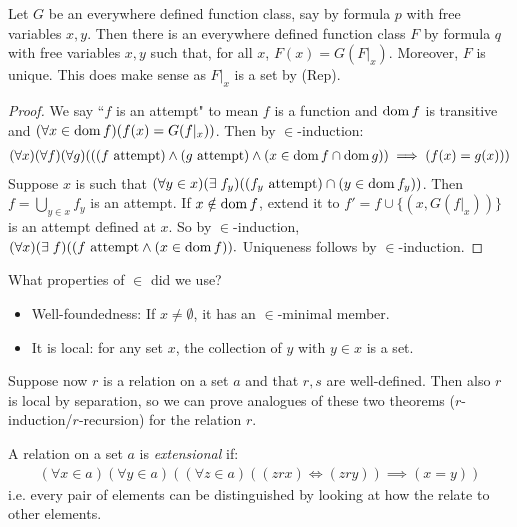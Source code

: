 \documentclass[10pt,a4paper]{article}
\begin{document}
\begin{theorem}
Let $G$ be an everywhere defined function class, say by formula $p$ with free variables $x,y$. Then there is an everywhere defined function class $F$ by formula $q$ with free variables $x,y$ such that, for all $x$, $F(x) = G(F|_x)$. Moreover, $F$ is unique. This does make sense as $F|_x$ is a set by (Rep). 
\end{theorem}
\begin{proof}
We say ``$f$ is an attempt" to mean $f$ is a function and $\operatorname{dom} f$ is transitive and $(\forall x \in \operatorname{dom} f)(f(x)=G(f|_x))$. Then by $\in$-induction:
\begin{align*}
(\forall x)(\forall f)(\forall g)(((f \text{ attempt})\wedge(g \text{ attempt})\wedge(x \in \operatorname{dom} f \cap \operatorname{dom} g))\implies (f(x)=g(x)))
\end{align*}
Suppose $x$ is such that $(\forall y \in x)(\exists f_y)((f_y\text{ attempt})\cap(y \in \dom f_y))$. Then $f = \bigcup_{y \in x}f_y$ is an attempt. If $x \notin \operatorname{dom} f$, extend it to $f' = f\cup\{(x, G(f|_x))\}$ is an attempt defined at $x$. So by $\in$-induction, $(\forall x)(\exists f)((f\text{ attempt}\wedge(x\in \dom f)).$ Uniqueness follows by $\in$-induction.
\end{proof}
What properties of $\in$ did we use?
\begin{itemize}
\item Well-foundedness: If $x \neq \emptyset$, it has an $\in$-minimal member.
\item It is local: for any set $x$, the collection of $y$ with $y \in x$ is a set.
\end{itemize}
Suppose now $r$ is a relation on a set $a$ and that $r,s$ are well-defined. Then  also $r$ is local by separation, so we can prove analogues of these two theorems ($r$-induction/$r$-recursion) for the relation $r$.

A relation on a set $a$ is \emph{extensional} if:
\begin{align*}
(\forall x \in a)(\forall y \in a)((\forall z \in a)((zrx)\iff (zry))\implies (x=y))
\end{align*}
i.e. every pair of elements can be distinguished by looking at how the relate to other elements.
\end{document}
